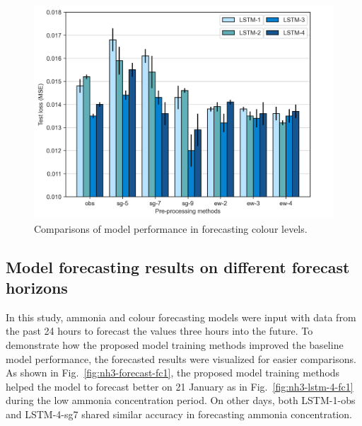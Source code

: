 \begin{figure}[!ht]
    \centering
    \includegraphics[width=1.0\columnwidth]{imgs/results/feature-engineering/colour-input-1-4-comparison.png}
    \caption{Comparisons of model performance in forecasting colour levels.}
    \label{fig:colour-feature-engineering}
 \end{figure}


\subsection{Model forecasting results on different forecast horizons}
In this study, ammonia and colour forecasting models were input with data from the past 24 hours to forecast the values three hours into the future. To demonstrate how the proposed model training methods improved the baseline model performance, the forecasted results were visualized for easier comparisons. As shown in Fig.~\ref{fig:nh3-forecast-fc1}, the proposed model training methods helped the model to forecast better on 21 January as in Fig.~\ref{fig:nh3-lstm-4-fc1} during the low ammonia concentration period. On other days, both LSTM-1-obs and LSTM-4-sg7 shared similar accuracy in forecasting ammonia concentration.

